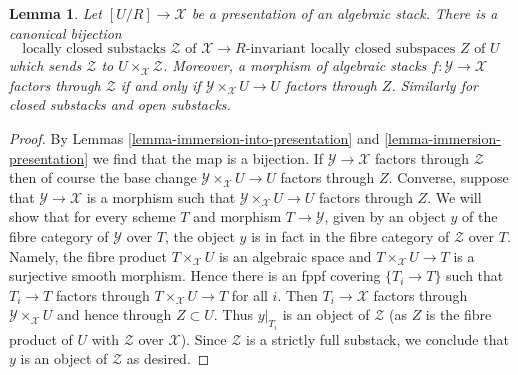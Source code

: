 \documentclass[10pt,a4paper]{amsart}
\theoremstyle{plain}
\newtheorem{lemma}[subsection]{Lemma}
\theoremstyle{definition}
\theoremstyle{remark}
\numberwithin{equation}{subsection}
\begin{document}
\begin{lemma}
\label{lemma-substacks-presentation}
Let $[U/R] \to \mathcal{X}$ be a presentation of an algebraic stack.
There is a canonical bijection
$$
\text{locally closed substacks }\mathcal{Z}\text{ of }\mathcal{X}
\longrightarrow
R\text{-invariant locally closed subspaces }Z\text{ of }U
$$
which sends $\mathcal{Z}$ to $U \times_\mathcal{X} \mathcal{Z}$.
Moreover, a morphism of algebraic stacks $f : \mathcal{Y} \to \mathcal{X}$
factors through $\mathcal{Z}$ if and only if
$\mathcal{Y} \times_\mathcal{X} U \to U$ factors through $Z$.
Similarly for closed substacks and open substacks.
\end{lemma}

\begin{proof}
By Lemmas \ref{lemma-immersion-into-presentation} and
\ref{lemma-immersion-presentation}
we find that the map is a bijection.
If $\mathcal{Y} \to \mathcal{X}$ factors through $\mathcal{Z}$
then of course the base change $\mathcal{Y} \times_\mathcal{X} U \to U$
factors through $Z$. Converse, suppose that $\mathcal{Y} \to \mathcal{X}$
is a morphism such that $\mathcal{Y} \times_\mathcal{X} U \to U$
factors through $Z$. We will show that for every scheme $T$ and
morphism $T \to \mathcal{Y}$,
given by an object $y$ of the fibre category of $\mathcal{Y}$ over $T$,
the object $y$ is in fact in the fibre category of $\mathcal{Z}$ over $T$.
Namely, the fibre product $T \times_\mathcal{X} U$ is an algebraic
space and $T \times_\mathcal{X} U \to T$ is a surjective smooth morphism.
Hence there is an fppf covering $\{T_i \to T\}$ such that
$T_i \to T$ factors through $T \times_\mathcal{X} U \to T$ for all $i$.
Then $T_i \to \mathcal{X}$ factors through $\mathcal{Y} \times_\mathcal{X} U$
and hence through $Z \subset U$. Thus $y|_{T_i}$ is an object of
$\mathcal{Z}$ (as $Z$ is the fibre product of $U$ with
$\mathcal{Z}$ over $\mathcal{X}$).
Since $\mathcal{Z}$ is a strictly full substack, we conclude
that $y$ is an object of $\mathcal{Z}$ as desired.
\end{proof}
\end{document}
